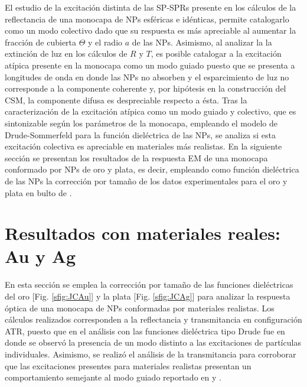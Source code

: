 El estudio de la excitación distinta de las SP-SPRs presente en los cálculos de la reflectancia de una monocapa de NPs esféricas e idénticas, permite catalogarlo como un modo colectivo dado que su respuesta es más apreciable al aumentar la fracción de cubierta $\Theta$ y el radio $a$ de las NPs. Asimismo, al analizar la la extinción de luz  en los cálculos de $R$ y $T$, es posible catalogar a la excitación atípica presente en la monocapa como un modo guiado puesto que se presenta a longitudes de onda en donde las NPs no absorben y el esparcimiento de luz no corresponde a la componente coherente y, por hipótesis en la construcción del CSM, la componente difusa es despreciable respecto a ésta. Tras la caracterización de la excitación atípica como un modo guiado y colectivo, que es sintonizable según los parámetros de la monocapa, empleando el modelo de Drude-Sommerfeld para la función dieléctrica de las NPs, se analiza si esta excitación colectiva es apreciable en materiales más realistas. En la siguiente sección se presentan los resultados de la respuesta EM de una monocapa conformado por NPs de oro y plata, es decir, empleando como función dieléctrica de las NPs la corrección por tamaño de los datos experimentales para el oro y plata en bulto de \cite{johnson1972constants}.

\section{Resultados con materiales reales: Au y Ag}

En esta sección se emplea la corrección por tamaño de las funciones dieléctricas del oro [Fig. \ref{sfig:JCAu}] y la plata [Fig. \ref{sfig:JCAg}] para analizar la respuesta óptica de una monocapa de NPs conformadas por materiales realistas. Los cálculos realizados corresponden a la reflectancia y transmitancia en configuración ATR, puesto que en el análisis con las funciones dieléctrica tipo Drude fue en donde se observó la presencia de un modo distinto a las excitaciones de partículas individuales. Asimismo, se realizó el análisis de la transmitancia para corroborar que las excitaciones presentes para materiales realistas presentan un comportamiento semejante al modo guiado reportado en \cite{kabashin2009plasmonic} y \cite{danilov2018ultra}.

